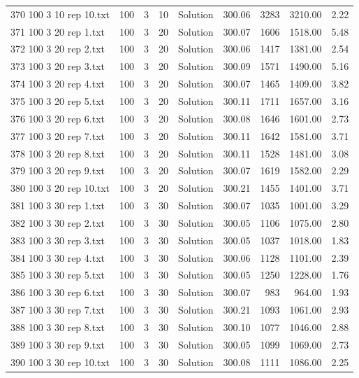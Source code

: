 \begin{longtable}{lrrllrrrr}
370 100 3 10 rep 10.txt & 100 & 3 & 10 & Solution & 300.06 & 3283 & 3210.00 &  2.22\\
371 100 3 20 rep 1.txt & 100 & 3 & 20 & Solution & 300.07 & 1606 & 1518.00 &  5.48\\
372 100 3 20 rep 2.txt & 100 & 3 & 20 & Solution & 300.06 & 1417 & 1381.00 &  2.54\\
373 100 3 20 rep 3.txt & 100 & 3 & 20 & Solution & 300.09 & 1571 & 1490.00 &  5.16\\
374 100 3 20 rep 4.txt & 100 & 3 & 20 & Solution & 300.07 & 1465 & 1409.00 &  3.82\\
375 100 3 20 rep 5.txt & 100 & 3 & 20 & Solution & 300.11 & 1711 & 1657.00 &  3.16\\
376 100 3 20 rep 6.txt & 100 & 3 & 20 & Solution & 300.08 & 1646 & 1601.00 &  2.73\\
377 100 3 20 rep 7.txt & 100 & 3 & 20 & Solution & 300.11 & 1642 & 1581.00 &  3.71\\
378 100 3 20 rep 8.txt & 100 & 3 & 20 & Solution & 300.11 & 1528 & 1481.00 &  3.08\\
379 100 3 20 rep 9.txt & 100 & 3 & 20 & Solution & 300.07 & 1619 & 1582.00 &  2.29\\
380 100 3 20 rep 10.txt & 100 & 3 & 20 & Solution & 300.21 & 1455 & 1401.00 &  3.71\\
381 100 3 30 rep 1.txt & 100 & 3 & 30 & Solution & 300.07 & 1035 & 1001.00 &  3.29\\
382 100 3 30 rep 2.txt & 100 & 3 & 30 & Solution & 300.05 & 1106 & 1075.00 &  2.80\\
383 100 3 30 rep 3.txt & 100 & 3 & 30 & Solution & 300.05 & 1037 & 1018.00 &  1.83\\
384 100 3 30 rep 4.txt & 100 & 3 & 30 & Solution & 300.06 & 1128 & 1101.00 &  2.39\\
385 100 3 30 rep 5.txt & 100 & 3 & 30 & Solution & 300.05 & 1250 & 1228.00 &  1.76\\
386 100 3 30 rep 6.txt & 100 & 3 & 30 & Solution & 300.07 & 983 & 964.00 &  1.93\\
387 100 3 30 rep 7.txt & 100 & 3 & 30 & Solution & 300.21 & 1093 & 1061.00 &  2.93\\
388 100 3 30 rep 8.txt & 100 & 3 & 30 & Solution & 300.10 & 1077 & 1046.00 &  2.88\\
389 100 3 30 rep 9.txt & 100 & 3 & 30 & Solution & 300.05 & 1099 & 1069.00 &  2.73\\
390 100 3 30 rep 10.txt & 100 & 3 & 30 & Solution & 300.08 & 1111 & 1086.00 &  2.25\\

\end{longtable}
